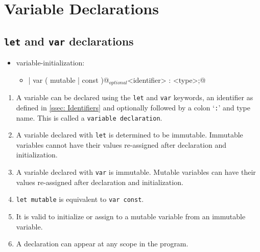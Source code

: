 \section{Variable Declarations}

\subsection{\texorpdfstring{\lstinline|let|}{let} and \texorpdfstring{\lstinline|var|}{var} declarations}
\begin{itemize}[before=\itshape, label={}]
	\item variable-initialization:
		\begin{itemize}[before=\itshape, label={}]
			\item \lstinline@let | var ( mutable | const )@$_{optional}$\lstinline@ <identifier> : <type>;@
		\end{itemize}
\end{itemize}
\begin{enumerate}
	\item A variable can be declared using the \lstinline|let| and \lstinline|var| keywords, an identifier as defined in \ref{ssec: Identifiers} and optionally followed by a colon `\lstinline|:|' and type name. This is called a \lstinline|variable declaration|.
	\item A variable declared with \lstinline|let| is determined to be immutable. Immutable variables cannot have their values re-assigned after declaration and initialization.
	\item A variable declared with \lstinline|var| is immutable. Mutable variables can have their values re-assigned after declaration and initialization.
	\item \lstinline|let mutable| is equivalent to \lstinline|var const|.
	\item It is valid to initialize or assign to a mutable variable from an immutable variable.
	\item A declaration can appear at any scope in the program.
\end{enumerate}
